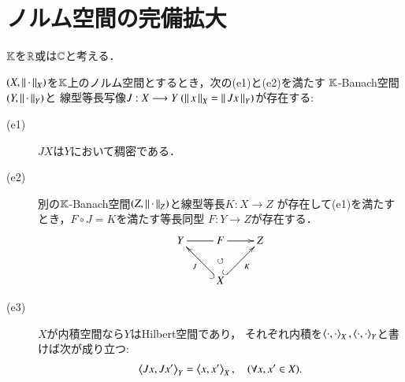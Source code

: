 \section{ノルム空間の完備拡大}
	$\mathbb{K}$を$\mathbb{R}$或は$\mathbb{C}$と考える．
	\begin{screen}
		\begin{thm}[ノルム空間の完備化]\label{thm:expansion_of_normed_space}
			$(X,\left\|\, \cdot\, \right\|_{X})$を$\mathbb{K}$上のノルム空間とするとき，次の(e1)と(e2)を満たす
			$\mathbb{K}$-Banach空間$(Y,\left\|\, \cdot\, \right\|_{Y})$と
			線型等長写像$J:X \longrightarrow Y\ (\left\|\, x\, \right\|_{X} = \left\|\, J x\, \right\|_{Y})$が存在する:
			\begin{description}
				\item[(e1)] $JX$は$Y$において稠密である．
				\item[(e2)] 別の$\mathbb{K}$-Banach空間$(Z,\left\|\, \cdot\, \right\|_{Z})$と線型等長$K:X \longrightarrow Z$
					が存在して(e1)を満たすとき，$F \circ J = K$を満たす等長同型
					$F:Y \longrightarrow Z$が存在する．
					\begin{align}
						\xymatrix{
							Y \ar@{-}[r] & F \ar[r] & Z \\
							& X \ar@{^{(}->}[lu]^-J \ar@{}[u]|\circlearrowleft \ar@{^{(}->}[ru]_-K & 
						}
					\end{align}
				\item[(e3)] $X$が内積空間なら$Y$はHilbert空間であり，
					それぞれ内積を$\inprod<\cdot,\cdot>_X,\inprod<\cdot,\cdot>_Y$と書けば次が成り立つ:
					\begin{align}
						\inprod<J x, J x'>_Y = \inprod<x,x'>_X,
						\quad (\forall x,x' \in X).
					\end{align}
			\end{description}
		\end{thm}
	\end{screen}
	
